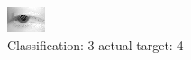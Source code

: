 \begin{figure}[h!]
\begin{center}
\includegraphics[width=0.60\columnwidth]{figures/ID2688_class_3_target_4.png}
\end{center}
\caption{ Classification: 3 actual target: 4}
\label{fig:ID2688_class_3_target_4}
\end{figure}
